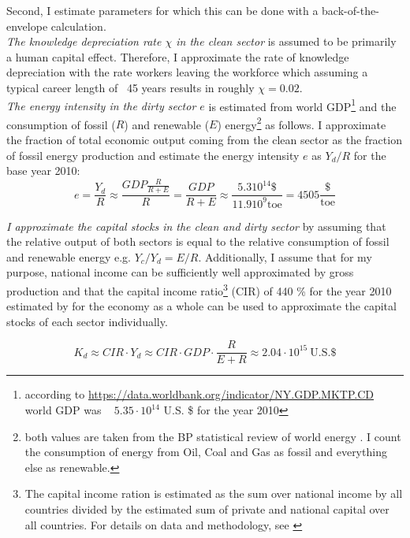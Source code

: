 Second, I estimate parameters for which this can be done with a back-of-the-envelope calculation.\\
\textit{The knowledge depreciation rate $\chi$ in the clean sector} is assumed to be primarily a human capital effect. Therefore, I approximate the rate of knowledge depreciation with the rate workers leaving the workforce which assuming a typical career length of ~45 years results in roughly $\chi=0.02$. \\
\textit{The energy intensity in the dirty sector $e$} is estimated from world GDP\footnote{according to \url{https://data.worldbank.org/indicator/NY.GDP.MKTP.CD} world GDP was ~ $5.35 \cdot 10^{14}$ U.S. \$ for the year 2010} and the consumption of fossil ($R$) and renewable ($E$) energy\footnote{both values are taken from the BP statistical review of world energy \cite{dudley2019bp}. I count the consumption of energy from Oil, Coal and Gas as fossil and everything else as renewable.} as follows. I approximate the fraction of total economic output coming from the clean sector as the fraction of fossil energy production and estimate the energy intensity $e$ as $Y_d/R$ for the base year 2010:
\begin{equation}
  e = \frac{Y_d}{R} \approx \frac{GDP \frac{R}{R+E}}{R} = \frac{GDP}{R+E} \approx \frac{5.3 10^{14} \$}{11.9 10^9 \mathrm{toe}} = 4505 \frac{\$}{\mathrm{toe}}
  \label{eq:energy_intensity_estimate}
\end{equation}

\textit{I approximate the capital stocks in the clean and dirty sector} by assuming that the relative output of both sectors is equal to the relative consumption of fossil and renewable energy e.g. $Y_c/Y_d = E/R$. Additionally, I assume that for my purpose, national income can be sufficiently well approximated by gross production and that the capital income ratio\footnote{The capital income ration is estimated as the sum over national income by all countries divided by the estimated sum of private and national capital over all countries. For details on data and methodology, see \cite{piketty2014technical}} (CIR) of 440 \% for the year 2010 estimated by \cite{piketty2014} for the economy as a whole can be used to approximate the capital stocks of each sector individually.

\begin{equation}
  K_d \approx CIR \cdot Y_d \approx CIR \cdot GDP \cdot \frac{R}{E + R} \approx 2.04 \cdot 10^{15} ~ \textrm{U.S.} \$
  \label{eq:approx_dirty_capital}
\end{equation}

